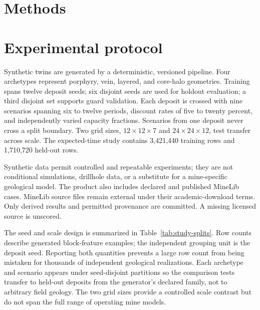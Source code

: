 \documentclass[11pt]{article}
\begin{document}
\section{Methods}

\section{Experimental protocol}
Synthetic twins are generated by a deterministic, versioned pipeline. Four archetypes represent porphyry, vein, layered, and core-halo geometries. Training spans twelve deposit seeds; six disjoint seeds are used for holdout evaluation; a third disjoint set supports guard validation. Each deposit is crossed with nine scenarios spanning six to twelve periods, discount rates of five to twenty percent, and independently varied capacity fractions. Scenarios from one deposit never cross a split boundary. Two grid sizes, $12\times12\times7$ and $24\times24\times12$, test transfer across scale. The expected-time study contains 3,421,440 training rows and 1,710,720 held-out rows.

Synthetic data permit controlled and repeatable experiments; they are not conditional simulations, drillhole data, or a substitute for a mine-specific geological model. The product also includes declared and published MineLib cases. MineLib source files remain external under their academic-download terms. Only derived results and permitted provenance are committed. A missing licensed source is unscored.

The seed and scale design is summarized in Table~\ref{tab:study-splits}. Row counts describe generated block-feature examples; the independent grouping unit is the deposit seed. Reporting both quantities prevents a large row count from being mistaken for thousands of independent geological realizations. Each archetype and scenario appears under seed-disjoint partitions so the comparison tests transfer to held-out deposits from the generator's declared family, not to arbitrary field geology. The two grid sizes provide a controlled scale contrast but do not span the full range of operating mine models.
\end{document}
